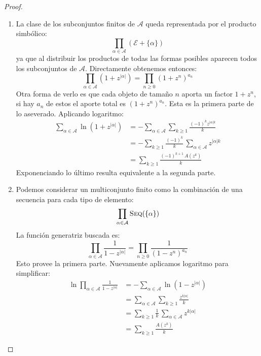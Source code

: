\documentclass[english, spanish, fleqn, 10pt]{article}
\numberwithin{equation}{section}
\theoremstyle{definition}
\DeclareMathOperator{\Seq}{\textsc{Seq}}
\begin{document}
\begin{proof}
\begin{enumerate}
		\item La clase de los subconjuntos finitos de \(\mathcal{A}\)
		queda representada por el producto simbólico:
		\begin{equation*}
		\prod_{\alpha \in \mathcal{A}} (\mathcal{E} + \{\alpha\})
		\end{equation*}
		ya que
		al distribuir los productos de todas las formas posibles
		aparecen todos los subconjuntos de \(\mathcal{A}\).
		Directamente obtenemos entonces:
		\begin{equation*}
		\prod_{\alpha \in \mathcal{A}}
		\left( 1 + z^{\lvert \alpha \rvert} \right)
		= \prod_{n \ge 0} (1 + z^n)^{a_n}
		\end{equation*}
		Otra forma de verlo es que cada objeto de tamaño \(n\)
		aporta un factor \(1 + z^n\),
		si hay \(a_n\) de estos
		el aporte total es \((1 + z^n)^{a_n}\).
		Esta es la primera parte de lo aseverado.
		Aplicando logaritmo:
		\begin{align*}
		\sum_{\alpha \in \mathcal{A}}
		\ln \left(1 + z^{\lvert \alpha \rvert} \right)
		&= -\sum_{\alpha \in \mathcal{A}}
		\sum_{k \ge 1}
		\frac{(-1)^k z^{\lvert \alpha \rvert k}}{k}  \\
		&= -\sum_{k \ge 1} \frac{(-1)^k}{k} \,
		\sum_{\alpha \in \mathcal{A}}
		z^{\lvert \alpha \rvert k} \\
		&= \sum_{k \ge 1} \frac{(-1)^{k + 1} \, A(z^k)}{k}
		\end{align*}
		Exponenciando lo último
		resulta equivalente a la segunda parte.
		
		\item Podemos considerar un multiconjunto finito
		como la combinación de una secuencia
		para cada tipo de elemento:
		\begin{equation*}
		\prod_{\alpha \in \mathcal{A}} \Seq(\{ \alpha \})
		\end{equation*}
		La función generatriz buscada es:
		\begin{equation*}
		\prod_{\alpha \in \mathcal{A}}
		\frac{1}{1 - z^{\lvert \alpha \rvert}}
		= \prod_{n \ge 0} \frac{1}{(1 - z^n)^{a_n}}
		\end{equation*}
		Esto provee la primera parte.
		Nuevamente aplicamos logaritmo para simplificar:
		\begin{align*}
		\ln \prod_{\alpha \in \mathcal{A}}
		\frac{1}{1 - z^{\lvert \alpha \rvert}}
		&= - \sum_{\alpha \in \mathcal{A}}
		\ln \left( 1 - z^{\lvert \alpha \rvert} \right) \\
		&= \sum_{\alpha \in \mathcal{A}}
		\sum_{k \ge 1}
		\frac{z^{k \lvert \alpha \rvert}}{k} \\
		&= \sum_{k \ge 1}
		\frac{1}{k} \,
		\sum_{\alpha \in \mathcal{A}}
		z^{k \lvert \alpha \rvert} \\
		&= \sum_{k \ge 1}
		\frac{A(z^k)}{k}
		\end{align*}
	\end{enumerate}
	
	
\end{proof}
\end{document}
